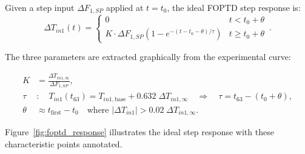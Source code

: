 Given a step input $\Delta F_{1,SP}$ applied at $t = t_0$, the ideal FOPTD step response is:
\begin{equation}
  \Delta T_{in1}(t) =
  \begin{cases}
    0 & t < t_0 + \theta \\
    K \cdot \Delta F_{1,SP}
      \left(1 - e^{-(t - t_0 - \theta)/\tau}\right) & t \geq t_0 + \theta
  \end{cases}\,.
  \label{eq:foptd_step}
\end{equation}

The three parameters are extracted graphically from the experimental curve:

\begin{align}
  K   &= \frac{\Delta T_{in1,\infty}}{\Delta F_{1,SP}},
  \label{eq:K_id}\\[4pt]
  \tau &: \quad T_{in1}(t_{63}) = T_{in1,\text{base}} + 0.632\;\Delta T_{in1,\infty}
  \quad \Rightarrow \quad \tau = t_{63} - (t_0 + \theta),
  \label{eq:tau_id}\\[4pt]
  \theta &\approx t_{\text{first}} - t_0
  \quad \text{where } |\Delta T_{in1}| > 0.02\;\Delta T_{in1,\infty}.
  \label{eq:theta_id}
\end{align}

Figure~\ref{fig:foptd_response} illustrates the ideal step response with these
characteristic points annotated.

